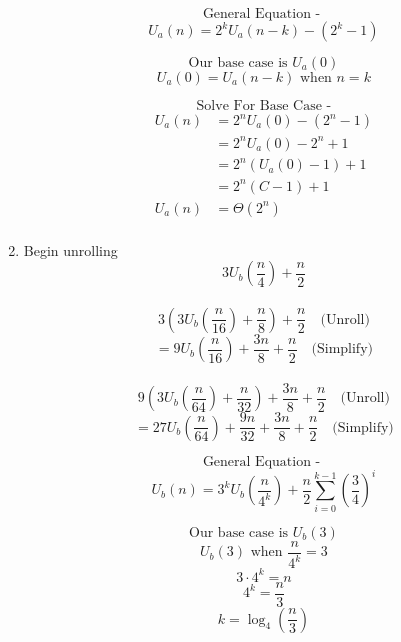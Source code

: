 \documentclass[9pt]{article}
\newcommand{\lp}{\left(}
\newcommand{\rp}{\right)}
\begin{document}
\begin{enumerate}
  $$\text{General Equation - }$$
  $$U_a (n) = 2^k U_a (n-k) - (2^k -1)$$
  
  $$\text{Our base case is } U_a(0)$$
  $$U_a (0) = U_a(n-k) \text{ when } n=k$$

  $$\text{Solve For Base Case -}$$
  \begin{equation}
    \begin{split}
    U_a(n) &= 2^n U_a (0) - (2^n -1)\\
           &= 2^n U_a (0) - 2^n + 1\\
           &= 2^n (U_a (0) - 1) + 1\\
           &= 2^n (C - 1) + 1\\
    U_a (n)&= \Theta (2^n)\\
    \end{split}\nonumber
    \end{equation}

  \newpage
  \item Begin unrolling \\
  $$3U_b(\frac{n}{4})+\frac{n}{2}$$\\
  $$3 \lp 3U_b(\frac{n}{16})+\frac{n}{8} \rp +\frac{n}{2}\quad\text{(Unroll)}$$
  $$ = 9U_b(\frac{n}{16}) + \frac{3n}{8} + \frac{n}{2} \quad\text{(Simplify)}$$\\
  $$9 \lp 3U_b(\frac{n}{64})+\frac{n}{32} \rp + \frac{3n}{8} + \frac{n}{2} \quad\text{(Unroll)}$$
  $$ = 27U_b(\frac{n}{64})+ \frac{9n}{32} + \frac{3n}{8} + \frac{n}{2} \quad\text{(Simplify)}$$

  $$\text{General Equation - }$$
  $$U_b (n) = 3^k U_b (\frac{n}{4^k}) + \frac{n}{2} \sum_{i=0} ^{k-1} \lp\frac{3}{4}\rp^i  $$
  
  $$\text{Our base case is } U_b(3)$$
  $$U_b (3) \text{ when } \frac{n}{4^k} = 3$$
  $$3\cdot 4^k = n$$
  $$4^k = \frac{n}{3}$$
  $$k = \log_4 \lp \frac{n}{3} \rp$$



\end{enumerate}
\end{document}
